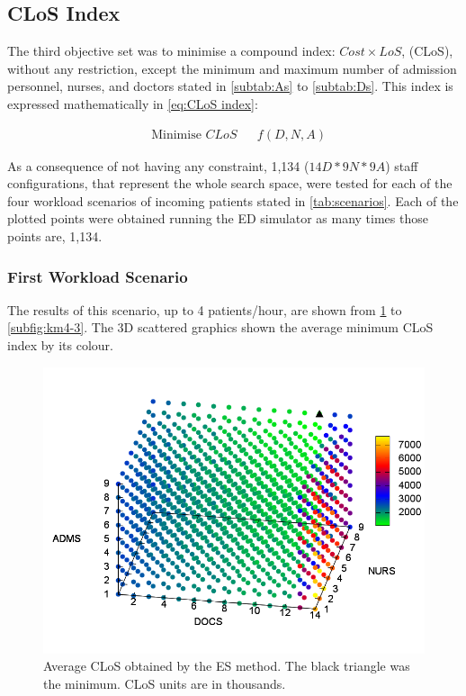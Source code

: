 \documentclass[11pt]{article} %
\begin{document}
\clearpage

\subsection{CLoS Index}

The third objective set was to minimise a compound index: $Cost\times LoS$,
(CLoS), without any restriction, except the minimum and maximum number
of admission personnel, nurses, and doctors stated in \ref{subtab:As}
to \ref{subtab:Ds}. This index is expressed mathematically in \ref{eq:CLoS index}:

\begin{equation}
\begin{aligned} & {\text{Minimise }CLoS} &  & f(D,N,A)\end{aligned}
\label{eq:CLoS index}
\end{equation}

As a consequence of not having any constraint, 1,134 ($14D*9N*9A$)
staff configurations, that represent the whole search space, were
tested for each of the four workload scenarios of incoming patients
stated in \ref{tab:scenarios}. Each of the plotted points were obtained
running the ED simulator as many times those points are, 1,134.

\subsubsection{First Workload Scenario}

The results of this scenario, up to 4 patients/hour, are shown from
\ref{subfig:es4-3} to \ref{subfig:km4-3}. The 3D scattered graphics
shown the average minimum CLoS index by its colour. 

\begin{figure}[H]
\centering{}\includegraphics[width=1\columnwidth,height=0.2\paperheight]{figs4/v03/6400-602-25-Cost_times_LoS-exh-min}
\caption{Average CLoS obtained by the ES method. The black triangle was the
minimum. CLoS units are in thousands. \label{subfig:es4-3}}
\end{figure}
\end{document}
